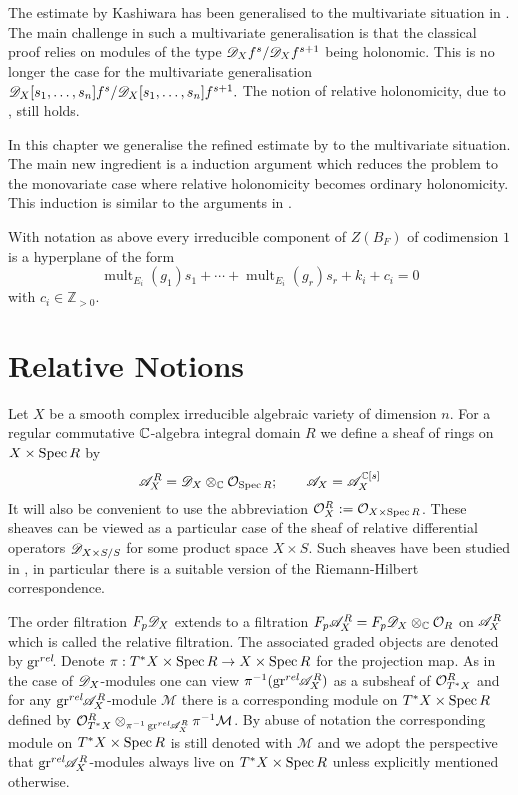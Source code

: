 The estimate by Kashiwara has been generalised to the multivariate situation in \cite{budur2020zero}.
The main challenge in such a multivariate generalisation is that the classical proof relies on modules of the type $\mathscr{D}_X f^{s}/ \mathscr{D}_X f^{s+1}$ being holonomic.
This is no longer the case for the multivariate generalisation $\mathscr{D}_X[s_1,\ldots, s_n]f^s /\mathscr{D}_X[s_1,\ldots, s_n]f^{s+1}.$
The notion of relative holonomicity, due to \cite{maisonobe2016filtration}, still holds.

In this chapter we generalise the refined estimate by \cite{lichtin1989poles} to the multivariate situation.
The main new ingredient is a induction argument which reduces the problem to the monovariate case where relative holonomicity becomes ordinary holonomicity.
This induction is similar to the arguments in \cite{budur2019zero}.
\begin{theorem}\label{thm: EstimateBernsteinSatoZeroLocust}
  With notation as above every irreducible component of $Z(B_F)$ of codimension $1$ is a hyperplane of the form
  $$\operatorname{mult}_{E_i}(g_1) s_1 + \cdots + \operatorname{mult}_{E_i}(g_r)s_r + k_i + c_i=0$$
  with $c_i \in \mathbb{Z}_{> 0 }$.
\end{theorem}
\section{Relative Notions}
Let $X$ be a smooth complex irreducible algebraic variety of dimension $n$.
For a regular commutative $\mathbb{C}$-algebra integral domain $R$ we define a sheaf of rings on $X\times \operatorname{Spec} R$ by
$$\mathscr{A}_{X}^R = \mathscr{D}_X \otimes_{\mathbb{C}} \mathcal{O}_{\operatorname{Spec} R}; \qquad \mathscr{A}_X = \mathscr{A}_{X}^{\mathbb{C}[s]}$$
It will also be convenient to use the abbreviation $\mathcal{O}_{X}^R := \mathcal{O}_{X \times \operatorname{Spec} R}$.
These sheaves can be viewed as a particular case of the sheaf of relative differential operators $\mathscr{D}_{X\times S / S}$ for some product space $X\times S$.
Such sheaves have been studied in \cite{monteiro2016riemann}, in particular there is a suitable version of the Riemann-Hilbert correspondence.

The order filtration $F_p\mathscr{D}_X$ extends to a filtration $F_p\mathscr{A}^R_X = F_p\mathscr{D}_X \otimes_{\mathbb{C}} \mathcal{O}_R$ on $\mathscr{A}^R_X$ which is called the relative filtration.
The associated graded objects are denoted by $\operatorname{gr}^{rel}\mkern-5mu$. Denote $\pi:T^*X\times \operatorname{Spec} R \to X\times \operatorname{Spec} R$ for the projection map.
As in the case of $\mathscr{D}_X$-modules one can view $\pi^{-1}(\operatorname{gr}^{rel}\mkern-5mu\mathscr{A}_X^R)$ as a subsheaf of $\mathcal{O}_{T^*X}^R$ and for any $\operatorname{gr}^{rel}\mkern-5mu\mathscr{A}_X^R$-module $\mathcal{M}$ there is a corresponding module on $T^*X\times \operatorname{Spec} R$ defined by $\mathcal{O}_{T^*X}^R\otimes_{\pi^{-1}\operatorname{gr}^{rel}\mkern-5mu\mathscr{A}_X^R}\pi^{-1}\mathcal{M}$.
By abuse of notation the corresponding module on $T^*X\times \operatorname{Spec} R$ is still denoted with $\mathcal{M}$ and we adopt the perspective that $\operatorname{gr}^{rel}\mkern-5mu\mathscr{A}_X^R$-modules always live on $T^*X\times \operatorname{Spec} R$ unless explicitly mentioned otherwise.

